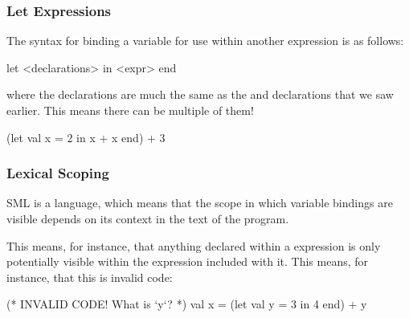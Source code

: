 \documentclass[aspectratio=169]{beamer}
\begin{document}
\begin{frame}[fragile]
  \frametitle{Let Expressions}

  {\small
  The syntax for binding a variable for use within another expression is as follows:

  \pause
  \vspace{\fill}

  \begin{codeblock}
    let
      <declarations>
    in
      <expr>
    end
  \end{codeblock}

  where the declarations are much the same as the  and  declarations
  that we saw earlier. This means there can be multiple of them!

  \pause
  \vspace{\fill}

  \begin{codeblock}
    (let
      val x = 2
    in
      x + x
    end) + 3
  \end{codeblock}
  }
\end{frame}

\begin{frame}[fragile]
  \frametitle{Lexical Scoping}

  SML is a  language, which means that the scope in which
  variable bindings are visible depends on its context in the text of the program.

  \pause
  \vspace{\fill}

  This means, for instance, that anything declared within a  expression
  is only potentially visible within the expression included with it. This means,
  for instance, that this is invalid code:

  \begin{codeblock}
    (* INVALID CODE! What is `y`? *)
    val x =
      (let
        val y = 3
      in
        4
      end) + y
  \end{codeblock}
\end{frame}
\end{document}
